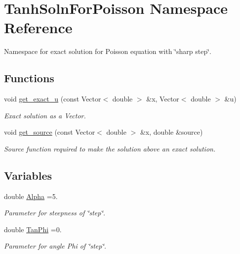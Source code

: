 \hypertarget{namespaceTanhSolnForPoisson}{}\section{Tanh\+Soln\+For\+Poisson Namespace Reference}
\label{namespaceTanhSolnForPoisson}


Namespace for exact solution for Poisson equation with \char`\"{}sharp step\char`\"{}.  


\subsection*{Functions}
\begin{DoxyCompactItemize}
\item 
void \hyperlink{namespaceTanhSolnForPoisson_af7896e9c18ce6438c73ae2a875e8b7de}{get\+\_\+exact\+\_\+u} (const Vector$<$ double $>$ \&x, Vector$<$ double $>$ \&u)
\begin{DoxyCompactList}\small\item\em Exact solution as a Vector. \end{DoxyCompactList}\item 
void \hyperlink{namespaceTanhSolnForPoisson_ae1b9d6789ff301e3d63a4e292213036c}{get\+\_\+source} (const Vector$<$ double $>$ \&x, double \&source)
\begin{DoxyCompactList}\small\item\em Source function required to make the solution above an exact solution. \end{DoxyCompactList}\end{DoxyCompactItemize}
\subsection*{Variables}
\begin{DoxyCompactItemize}
\item 
double \hyperlink{namespaceTanhSolnForPoisson_ae676ccd186d5df119cce811596d949c1}{Alpha} =5.
\begin{DoxyCompactList}\small\item\em Parameter for steepness of \char`\"{}step\char`\"{}. \end{DoxyCompactList}\item 
double \hyperlink{namespaceTanhSolnForPoisson_a785ccd00a727125a5138fbbcac173294}{Tan\+Phi} =0.
\begin{DoxyCompactList}\small\item\em Parameter for angle Phi of \char`\"{}step\char`\"{}. \end{DoxyCompactList}\end{DoxyCompactItemize}


